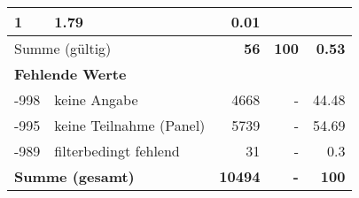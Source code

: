 \begin{longtable}{lXrrr}
       \num{1} &
       \num[round-mode=places,round-precision=2]{1,79} &
         \num[round-mode=places,round-precision=2]{0,01} \\
     \midrule
     \multicolumn{2}{l}{Summe (gültig)} &
       \textbf{\num{56}} &
     \textbf{100} &
       \textbf{\num[round-mode=places,round-precision=2]{0,53}} \\
     \multicolumn{5}{l}{\textbf{Fehlende Werte}}\\
       -998 &
       keine Angabe &
         \num{4668} &
        - &
         \num[round-mode=places,round-precision=2]{44,48} \\
       -995 &
       keine Teilnahme (Panel) &
         \num{5739} &
        - &
         \num[round-mode=places,round-precision=2]{54,69} \\
       -989 &
       filterbedingt fehlend &
         \num{31} &
        - &
         \num[round-mode=places,round-precision=2]{0,3} \\
     \midrule
     \multicolumn{2}{l}{\textbf{Summe (gesamt)}} &
          \textbf{\num{10494}} &
        \textbf{-} &
        \textbf{100} \\
     \bottomrule
     \end{longtable}
     
